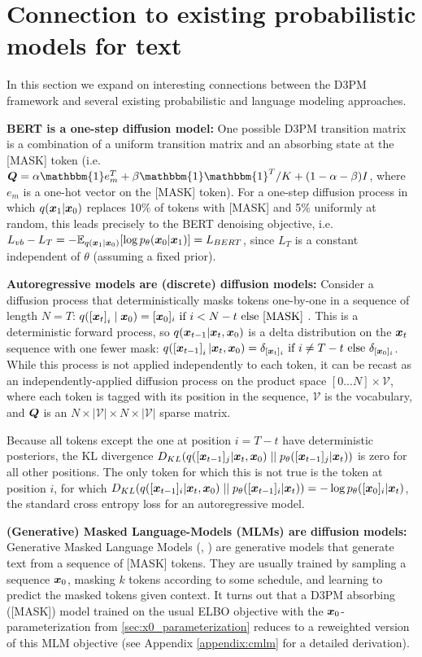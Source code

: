 \section{Connection to existing probabilistic models for text}
\label{sec:bert_connections}
In this section we expand on interesting connections between the D3PM framework and several existing probabilistic and language modeling approaches.

\textbf{BERT is a one-step diffusion model:} One possible D3PM transition matrix is a combination of a uniform transition matrix and an absorbing state at the [MASK] token
(i.e. $\bs{Q} = \alpha \mathbbm{1} e_m^T + \beta \mathbbm{1}\mathbbm{1}^T/K + (1 - \alpha - \beta) I$, where $e_m$ is a one-hot vector on the [MASK] token).
For a one-step diffusion process in which $q(\boldsymbol{x}_1 | \boldsymbol{x}_0)$ replaces 10\% of tokens with [MASK] and 5\% uniformly at random, this leads precisely to the BERT denoising objective, i.e. $L_{vb} - L_T = - \mathbb E_{q(\boldsymbol{x}_1|\boldsymbol{x}_0)} [\log p_{\theta}(\boldsymbol{x}_0|\boldsymbol{x}_1)] = L_{BERT}$,
since $L_T$ is a constant independent of $\theta$ (assuming a fixed prior).

\textbf{Autoregressive models are (discrete) diffusion models:} Consider a diffusion process that deterministically masks tokens one-by-one in a sequence of length $N=T$:
$q(\left[\boldsymbol{x}_t\right]_i \mid \boldsymbol{x}_0) = [\boldsymbol{x}_0]_i \text{ if } i < N - t \text{ else [MASK] }$. This is a deterministic forward process, so $q(\boldsymbol{x}_{t-1} | \boldsymbol{x}_t, \boldsymbol{x}_0)$ is a delta distribution on the $\boldsymbol{x}_t$ sequence with one fewer mask: $q(\left[\boldsymbol{x}_{t-1}\right]_i | \boldsymbol{x}_t, \boldsymbol{x}_0) = \delta_{[\boldsymbol{x}_{t}]_i} \text{ if } i\neq T - t \text{ else } \delta_{[\boldsymbol{x}_0]_i}$. While this process is not applied independently to each token, it can
be recast as an independently-applied diffusion process on the product space
$[0...N]\times\mathcal{V}$, where each token is tagged with its position in the sequence, $\mathcal{V}$ is the vocabulary, and $\boldsymbol{Q}$ is an $N\times|\mathcal V|\times N\times |\mathcal V|$ sparse matrix.

Because all tokens except the one at position $i = T - t$ have deterministic posteriors, the KL divergence $D_{KL}(q([\boldsymbol{x}_{t-1}]_j | \boldsymbol{x}_t, \boldsymbol{x}_0)\mid\mid p_\theta([\boldsymbol{x}_{t-1}]_j | \boldsymbol{x}_t))$ is zero for all other positions. The only token for which this is not true is the token at position $i$, for which $D_{KL}(q([\boldsymbol{x}_{t-1}]_i| \boldsymbol{x}_t, \boldsymbol{x}_0)\mid\mid p_\theta([\boldsymbol{x}_{t-1}]_i | \boldsymbol{x}_t)) = -\log p_\theta([\boldsymbol{x}_0]_i | \boldsymbol{x}_t)$, the standard cross entropy loss for an autoregressive model.

\textbf{(Generative) Masked Language-Models (MLMs) are diffusion models:} Generative Masked Language Models (\citep{mask_predict}, \citep{bert_speak}) are generative models that generate text from a sequence of [MASK] tokens. They are usually trained by sampling a sequence $\boldsymbol{x}_0$, masking $k$ tokens according to some schedule, and learning to predict the masked tokens given context. It turns out that a D3PM absorbing ([MASK]) model trained on the usual ELBO objective with
the $\boldsymbol{x}_0$-parameterization from \ref{sec:x0_parameterization} reduces to a reweighted version of this MLM objective (see Appendix \ref{appendix:cmlm} for a detailed derivation).
